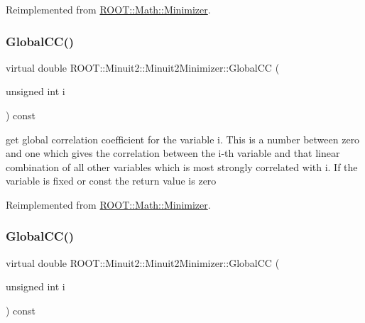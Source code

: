 Reimplemented from \mbox{\hyperlink{classROOT_1_1Math_1_1Minimizer_aeaef75b766eff7088939259c842ab056}{R\+O\+O\+T\+::\+Math\+::\+Minimizer}}.

\mbox{\label{classROOT_1_1Minuit2_1_1Minuit2Minimizer_adde21edb0a67e0eef950049528cfb9a7}} 
\subsubsection{\texorpdfstring{GlobalCC()}{GlobalCC()}\hspace{0.1cm}{\footnotesize\ttfamily [1/3]}}
{\footnotesize\ttfamily virtual double R\+O\+O\+T\+::\+Minuit2\+::\+Minuit2\+Minimizer\+::\+Global\+CC (\begin{DoxyParamCaption}\item[{unsigned int}]{i }\end{DoxyParamCaption}) const\hspace{0.3cm}{\ttfamily [virtual]}}

get global correlation coefficient for the variable i. This is a number between zero and one which gives the correlation between the i-\/th variable and that linear combination of all other variables which is most strongly correlated with i. If the variable is fixed or const the return value is zero 

Reimplemented from \mbox{\hyperlink{classROOT_1_1Math_1_1Minimizer_a6b50b0b0ccb0cb23da281ef978d145c5}{R\+O\+O\+T\+::\+Math\+::\+Minimizer}}.

\mbox{\label{classROOT_1_1Minuit2_1_1Minuit2Minimizer_adde21edb0a67e0eef950049528cfb9a7}} 
\subsubsection{\texorpdfstring{GlobalCC()}{GlobalCC()}\hspace{0.1cm}{\footnotesize\ttfamily [2/3]}}
{\footnotesize\ttfamily virtual double R\+O\+O\+T\+::\+Minuit2\+::\+Minuit2\+Minimizer\+::\+Global\+CC (\begin{DoxyParamCaption}\item[{unsigned int}]{i }\end{DoxyParamCaption}) const\hspace{0.3cm}{\ttfamily [virtual]}}

